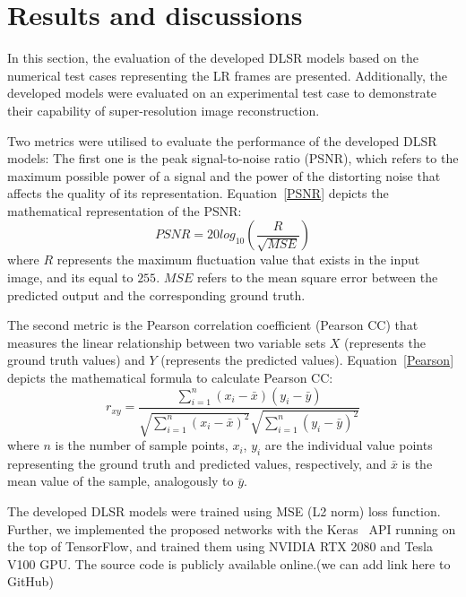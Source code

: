 \section{Results and discussions}
In this section, the evaluation of the developed DLSR models based on the numerical test cases representing the LR frames are presented.
Additionally, the developed models were evaluated on an experimental test case to demonstrate their capability of super-resolution image reconstruction.

Two metrics were utilised to evaluate the performance of the developed DLSR models:
The first one is the peak signal-to-noise ratio (PSNR), which refers to the maximum possible power of a signal and the power of the distorting noise that affects the quality of its representation.
Equation~\ref{PSNR} depicts the mathematical representation of the PSNR:
\begin{equation}
	PSNR=20log_{10}\left(\frac{R}{\sqrt{MSE}}\right)
	\label{PSNR}
\end{equation}
where \(R\) represents the maximum fluctuation value that exists in the input image, and its equal to \(255\).
\(MSE\) refers to the mean square error between the predicted output and the corresponding ground truth.

The second metric is the Pearson correlation coefficient (Pearson CC) that measures the linear relationship between two variable sets \textbf{\(X\)} (represents the ground truth values) and \textbf{\(Y\)} (represents the predicted values).
Equation~\ref{Pearson} depicts the mathematical formula to calculate Pearson CC:
\begin{equation}
	r_{xy} = \frac{\sum_{i=1}^{n}(x_i - \bar{x})(y_i-\bar{y})}{\sqrt{\sum_{i=1}^{n}(x_i - \bar{x})^2}\sqrt{\sum_{i=1}^{n}(y_i - \bar{y})^2}}
	\label{Pearson}
\end{equation}
where \(n\) is the number of sample points, \(x_i\), \(y_i\) are the individual value points representing the ground truth and predicted values, respectively, and \(\bar{x}\) is the mean value of the sample, analogously to \(\bar{y}\).

The developed DLSR models were trained using MSE (L2 norm) loss function.
Further, we implemented the proposed networks with the Keras~\cite{chollet2015keras} API running on the top of TensorFlow, and trained them using NVIDIA RTX 2080 and Tesla V100 GPU. 
The source code is publicly available online.(we can add link here to GitHub)
\clearpage

